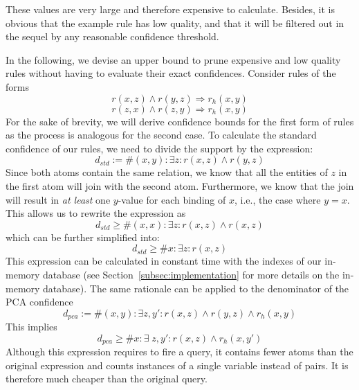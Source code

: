 {These values are very large and therefore expensive to calculate. Besides, it is obvious that the example rule has low quality, and
that it will be filtered out in the sequel by any reasonable confidence threshold.

In the following, we devise an upper bound to prune expensive and low quality rules without having to evaluate their exact confidences.
Consider rules of the forms
$$ r(x,z) \wedge r(y,z) \Rightarrow r_h(x,y) $$
$$ r(z,x) \wedge r(z,y) \Rightarrow r_h(x,y) $$
For the sake of brevity, we will derive confidence bounds for the first form of rules as the process is analogous for the second case.
To calculate the standard confidence of our rules, we need to divide the support by the expression:
$$
d_{std} := \#(x,y): \exists z: r(x,z) \wedge r(y,z)
$$
Since both atoms contain the same relation, we know that all the entities of $z$ in the first atom
will join with the second atom. Furthermore,
we know that the join will result in \emph{at least} one $y$-value for each binding of $x$, i.e., the case where $y=x$. This allows us to rewrite
the expression as
$$
d_{std} \ge \#(x,x): \exists z:  r(x,z) \wedge r(x,z)
$$
which can be further simplified into:
\begin{equation}
 d_{std} \ge \#x: \exists z:  r(x,z)  \label{eq:stdBoundDenom}
\end{equation}
This expression can be calculated in constant time with the indexes of our in-memory database (see Section~\ref{subsec:implementation} for more details on the in-memory database).
The same rationale can be applied to the denominator of the PCA confidence
$$
d_{pca} := \#(x,y): \exists z, y': r(x,z) \wedge r(y,z) \wedge r_h(x,y)
$$
This implies
\begin{equation} \label{eq:pcaBoundDenom}
d_{pca} \ge \#x: \exists \;z, y': r(x,z) \wedge r_h(x,y')
\end{equation}
Although this expression requires to fire a query, it contains fewer atoms than the original expression and counts instances
of a single variable instead of pairs. It is therefore much cheaper than the original query.

}
